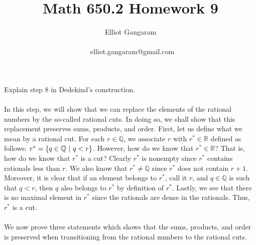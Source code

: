 \documentclass[12pt]{article}
\title{Math 650.2 Homework 9}
\author{Elliot Gangaram\\
\date{}
\ elliot.gangaram@gmail.com \\}
\begin{document}
\maketitle

\problem  Explain step 8 in Dedekind's construction. \\ \\

In this step, we will show that we can replace the elements of the rational numbers by the so-called rational cuts. In doing so, we shall show that this replacement preserves sums, products, and order. First, let us define what we mean by a rational cut. For each $r \in \mathbb{Q}$, we associate $r$ with $r^{*} \in \mathbb{R}$ defined as follows: $r^{*} = \left\{q \in \mathbb{Q} ~|~q<r\right\}$. However, how do we know that $r^{*} \in \mathbb{R}$? That is, how do we know that $r^{*}$ is a cut? Clearly $r^{*}$ is nonempty since $r^{*}$ contains rationals less than $r$. We also know that $r^{*} \neq \mathbb{Q}$ since $r^{*}$ does not contain $r+1$. Moreover, it is clear that if an element belongs to $r^{*}$, call it $r$, and $q \in \mathbb{Q}$ is such that $q<r$, then $q$ also belongs to $r^{*}$ by definition of $r^{*}$. Lastly, we see that there is no maximal element in $r^{*}$ since the rationals are dense in the rationals. Thus, $r^{*}$ is a cut. \\ \\

We now prove three statements which shows that the sums, products, and order is preserved when transitioning from the rational numbers to the rational cuts. 
\end{document}
